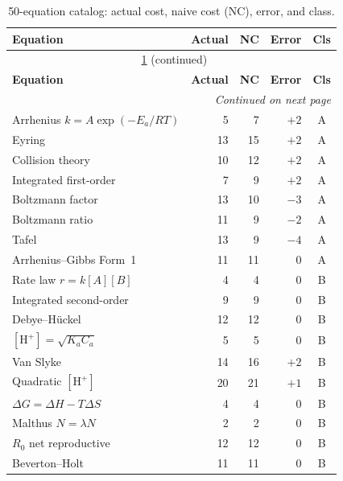 \documentclass[12pt,a4paper]{article}
\theoremstyle{definition}
\begin{document}
\begin{longtable}{@{}p{5.2cm}rrrc@{}}
\caption{50-equation catalog: actual cost, naive cost (NC), error, and class.}
\label{tab:catalog}\\
\toprule
\textbf{Equation} & \textbf{Actual} & \textbf{NC} & \textbf{Error} & \textbf{Cls} \\
\midrule
\endfirsthead
\multicolumn{5}{c}{\tablename\ \ref{tab:catalog} (continued)}\\
\toprule
\textbf{Equation} & \textbf{Actual} & \textbf{NC} & \textbf{Error} & \textbf{Cls} \\
\midrule
\endhead
\midrule
\multicolumn{5}{r}{\textit{Continued on next page}}\\
\endfoot
\bottomrule
\endlastfoot
Arrhenius $k=A\exp(-E_a/RT)$           & 5  & 7  & $+2$ & A \\
Eyring                                  & 13 & 15 & $+2$ & A \\
Collision theory                        & 10 & 12 & $+2$ & A \\
Integrated first-order                  & 7  & 9  & $+2$ & A \\
Boltzmann factor                        & 13 & 10 & $-3$ & A \\
Boltzmann ratio                         & 11 & 9  & $-2$ & A \\
Tafel                                   & 13 & 9  & $-4$ & A \\
Arrhenius--Gibbs Form~1                 & 11 & 11 & $0$  & A \\
\midrule
Rate law $r=k[A][B]$                    & 4  & 4  & $0$  & B \\
Integrated second-order                 & 9  & 9  & $0$  & B \\
Debye--H\"{u}ckel                      & 12 & 12 & $0$  & B \\
$[\mathrm{H}^+]=\sqrt{K_a C_a}$        & 5  & 5  & $0$  & B \\
Van Slyke                               & 14 & 16 & $+2$ & B \\
Quadratic $[\mathrm{H}^+]$             & 20 & 21 & $+1$ & B \\
$\Delta G = \Delta H - T\Delta S$       & 4  & 4  & $0$  & B \\
Malthus $N=\lambda N$                   & 2  & 2  & $0$  & B \\
$R_0$ net reproductive                  & 12 & 12 & $0$  & B \\
Beverton--Holt                          & 11 & 11 & $0$  & B \\

\end{longtable}
\end{document}
